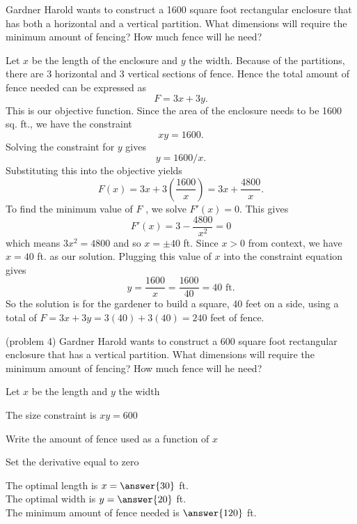\documentclass{ximera}
\begin{document}
\begin{example}[example 4]
Gardner Harold wants to construct a 1600 square foot  rectangular enclosure that has both a 
horizontal and a vertical partition. What dimensions will require the minimum amount of fencing?  
How much fence will he need?

\begin{center}
\end{center}

Let $x$ be the length of the enclosure and $y$ the width. Because of the partitions, there are 3 horizontal and 3 vertical sections of fence. Hence the total amount of fence needed can be expressed as 
\[F = 3x + 3y.\]
 This is our objective function. Since the area of the enclosure needs to be 1600 sq. ft., we have the constraint 
\[xy = 1600.\]
Solving the constraint for $y$ gives 
\[
y = 1600/x.
\]
  Substituting this into the objective yields
\[F(x) = 3x + 3\left(\frac{1600}{x}\right) = 3x + \frac{4800}{x}.\]
To find the minimum value of $F$ , we solve $F'(x) = 0$. This gives
\[F'(x) = 3 - \frac{4800}{x^2} = 0\]
which means $3x^2 = 4800$ and so $x = \pm 40$ ft.  Since $x>0$ from context, we have $x = 40$ ft. as our solution.
Plugging this value of $x$ into the constraint equation gives
\[y = \frac{1600}{x} = \frac{1600}{40} = 40 \mbox{ ft.}\]
So the solution is for the gardener to build a square, 40 feet on a side, using a total of $F = 3x+ 3y = 3(40) + 3(40)
= 240$ feet of fence.
\end{example}

\begin{problem}(problem 4)
Gardner Harold wants to construct a 600 square foot  rectangular enclosure that has a 
vertical partition. What dimensions will require the minimum amount of fencing?  
How much fence will he need?

\begin{hint}
Let $x$ be the length and $y$ the width
\end{hint}
\begin{hint}
The size constraint is $xy = 600$
\end{hint}
\begin{hint}
Write the amount of fence used as a function of $x$
\end{hint}
\begin{hint}
Set the derivative equal to zero
\end{hint}

The optimal length is $x= \answer{30}$ ft.\\
The optimal width is $y = \answer{20}$ ft.\\
The minimum amount of fence needed is $\answer{120}$ ft.
\end{problem}
\end{document}
